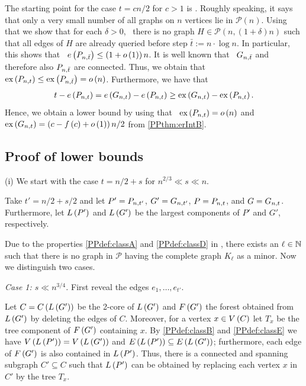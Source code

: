 The starting point for the case $t=cn/2$ for $c>1$ is . Roughly speaking, it says that only a very small number of all graphs on $n$ vertices lie in $\mathcal{P}(n)$. Using that we show that for each $\delta>0$, \whp\ there is no graph $H\in\mathcal{P}\left(n, \left(1+\delta\right)n\right)$ such that all edges of $H$ are already queried before step $\bar{t}:=n \cdot \log n$. In particular, this shows that \whp\ $e\left({P_{n,\bar{t}}}\right)\leq \left(1+o\left(1\right)\right)n$. It is well known that \whp\ $G_{n,\bar{t}}$ and therefore also $P_{n,\bar{t}}$ are connected. Thus, we obtain that \whp\ $\operatorname{ex}\left(P_{n,t}\right)\leq \operatorname{ex}\left(P_{n,\bar{t}}\right)=o\left(n\right)$. Furthermore, we have that
\begin{align*}
t-e\left({P_{n,t}}\right)=e\left({G_{n,t}}\right)-e\left({P_{n,t}}\right)\geq \operatorname{ex}\left(G_{n,t}\right)-\operatorname{ex}\left(P_{n,t}\right).
\end{align*}
Hence, we obtain a lower bound by using that \whp\ $\operatorname{ex}\left(P_{n,t}\right)=o\left(n\right)$ and $\operatorname{ex}\left(G_{n,t}\right)=\left(c-f\left(c\right)+o\left(1\right)\right)n/2$ from \ref{PPthm:erIntB}.


\subsection{Proof of lower bounds}\label{PPsubsec:proofLower}
(i) We start with the case $t=n/2+s$ for $n^{2/3}\ll s\ll n$. 

Take $t'=n/2+s/2$ and let $P'=P_{n,t'}$, $G'=G_{n,t'}$, $P=P_{n,t}$, and $G=G_{n,t}$. Furthermore, let $L\left(P'\right)$ and $L\left(G'\right)$ be the largest components of $P'$ and $G'$, respectively. 

Due to the properties \ref{PPdef:classA} and \ref{PPdef:classD} in , there exists an $\ell\in\mathbb{N}$ such that there is no graph in $\mathcal{P}$ having the complete graph $K_\ell$ as a minor. Now we distinguish two cases.

\textit{Case 1: $s\ll n^{3/4}$.}
First reveal the edges $e_1, \ldots, e_{t'}$.

Let $C=C\left(L\left(G'\right)\right)$ be the 2-core of $L\left(G'\right)$ and $F\left(G'\right)$ the forest obtained from $L\left(G'\right)$ by deleting the edges of $C$. Moreover, for a vertex $x\in V\left(C\right)$ let $T_x$ be the tree component of $F\left(G'\right)$ containing $x$. By \ref{PPdef:classB} and \ref{PPdef:classE} we have $V\left(L\left(P'\right)\right)=V\left(L\left(G'\right)\right)$ and $E\left(L\left(P'\right)\right)\subseteq E\left(L\left(G'\right)\right)$; furthermore, each edge of $F\left(G'\right)$ is also contained in $L\left(P'\right)$. Thus, there is a connected and spanning subgraph $C'\subseteq C$ such that $L\left(P'\right)$ can be obtained by replacing each vertex $x$ in $C'$ by the tree $T_x$. 

